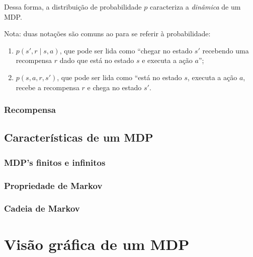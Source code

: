 \documentclass{article}
\begin{document}
                Dessa forma, a distribuição de probabilidade $p$ caracteriza a \emph{dinâmica} de um MDP.
            
                Nota: duas notações são comuns ao para se referir à probabilidade:
                
                \begin{enumerate}
                    \item $p(s', r \mid s, a)$, que pode ser lida como ``chegar no estado $s'$ recebendo uma recompensa $r$ dado que está no estado $s$ e executa a ação $a$'';
                    \item $p(s, a, r, s')$, que pode ser lida como ``está no estado $s$, executa a ação $a$, recebe a recompensa $r$ e chega no estado $s'$.
                \end{enumerate}
                
            \subsubsection{Recompensa}
        
        
        \subsection{Características de um MDP}
        
            \subsubsection{MDP's finitos e infinitos}
            
            \subsubsection{Propriedade de Markov}
            
            \subsubsection{Cadeia de Markov}
        
    \section{Visão gráfica de um MDP}
    
\end{document}
